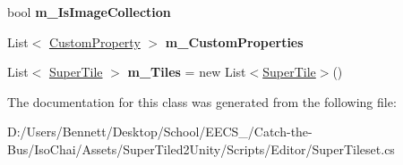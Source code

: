 \begin{DoxyCompactItemize}
\mbox{\label{class_super_tiled2_unity_1_1_editor_1_1_super_tileset_a9ff932bdb78ceb81f314ab3455755a0f}} 
bool {\bfseries m\+\_\+\+Is\+Image\+Collection}
\item 
\mbox{\label{class_super_tiled2_unity_1_1_editor_1_1_super_tileset_a500d90188f7491ee340a70ab42fe1071}} 
List$<$ \mbox{\hyperlink{class_super_tiled2_unity_1_1_custom_property}{Custom\+Property}} $>$ {\bfseries m\+\_\+\+Custom\+Properties}
\item 
\mbox{\label{class_super_tiled2_unity_1_1_editor_1_1_super_tileset_a717756afe84f3964e082a72135228047}} 
List$<$ \mbox{\hyperlink{class_super_tiled2_unity_1_1_super_tile}{Super\+Tile}} $>$ {\bfseries m\+\_\+\+Tiles} = new List$<$\mbox{\hyperlink{class_super_tiled2_unity_1_1_super_tile}{Super\+Tile}}$>$()
\end{DoxyCompactItemize}


The documentation for this class was generated from the following file\+:\begin{DoxyCompactItemize}
\item 
D\+:/\+Users/\+Bennett/\+Desktop/\+School/\+E\+E\+C\+S\+\_/\+Catch-\/the-\/\+Bus/\+Iso\+Chai/\+Assets/\+Super\+Tiled2\+Unity/\+Scripts/\+Editor/Super\+Tileset.\+cs\end{DoxyCompactItemize}
